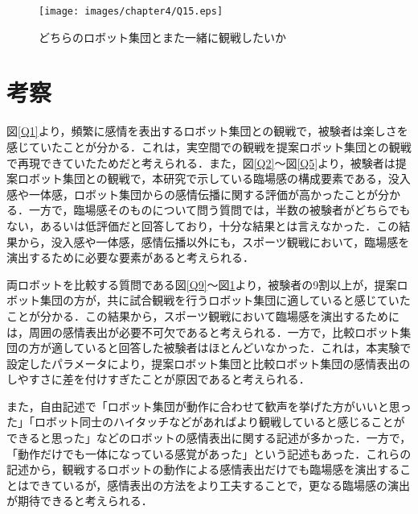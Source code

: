 \newpage

\vspace{1cm}
\begin{figure}[!h]
 \begin{center}
  \centering
  \texttt{[image: images/chapter4/Q15.eps]}
  \caption{どちらのロボット集団とまた一緒に観戦したいか}
  \label{Q15}
 \end{center}
\end{figure}





\newpage

\section{考察}
\label{sec4.4}

図\ref{Q1}より，頻繁に感情を表出するロボット集団との観戦で，被験者は楽しさを感じていたことが分かる．これは，実空間での観戦を提案ロボット集団との観戦で再現できていたためだと考えられる．また，図\ref{Q2}～図\ref{Q5}より，被験者は提案ロボット集団との観戦で，本研究で示している臨場感の構成要素である，没入感や一体感，ロボット集団からの感情伝播に関する評価が高かったことが分かる．一方で，臨場感そのものについて問う質問では，半数の被験者がどちらでもない，あるいは低評価だと回答しており，十分な結果とは言えなかった．この結果から，没入感や一体感，感情伝播以外にも，スポーツ観戦において，臨場感を演出するために必要な要素があると考えられる．

両ロボットを比較する質問である図\ref{Q9}～図\ref{Q15}より，被験者の9割以上が，提案ロボット集団の方が，共に試合観戦を行うロボット集団に適していると感じていたことが分かる．この結果から，スポーツ観戦において臨場感を演出するためには，周囲の感情表出が必要不可欠であると考えられる．一方で，比較ロボット集団の方が適していると回答した被験者はほとんどいなかった．これは，本実験で設定したパラメータにより，提案ロボット集団と比較ロボット集団の感情表出のしやすさに差を付けすぎたことが原因であると考えられる．

また，自由記述で「ロボット集団が動作に合わせて歓声を挙げた方がいいと思った」「ロボット同士のハイタッチなどがあればより観戦していると感じることができると思った」などのロボットの感情表出に関する記述が多かった．一方で，「動作だけでも一体になっている感覚があった」という記述もあった．これらの記述から，観戦するロボットの動作による感情表出だけでも臨場感を演出することはできているが，感情表出の方法をより工夫することで，更なる臨場感の演出が期待できると考えられる．














